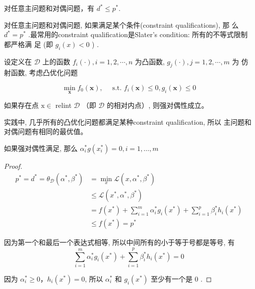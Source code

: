 \begin{theorem}[弱对偶性]
    对任意主问题和对偶问题，有 $ d^{*} \leqslant p^{*} $.
\end{theorem}

\begin{theorem}[强对偶性]
    对任意主问题和对偶问题, 如果满足某个条件(constraint qualifications), 那 么 $ d^{*}=p^{*} $ .最常用的constraint qualification是Slater's condition: 所有的不等式限制都严格满 足 (即 $ g_{i}(x)<0 $ ) .
\end{theorem}

\begin{theorem}[Slater 条件]
    设定义在 $ \mathcal{D} $ 上的函数 $ f_{i}(\cdot), i=1,2, \cdots, n $ 为凸函数, $ g_{j}(\cdot), j=1,2, \cdots, m $ 为 仿射函数, 考虑凸优化问题

    $$
    \min _{\mathbf{x}} f_{0}(\mathbf{x}), \quad \text { s.t. } f_{i}(\mathbf{x}) \leq 0, g_{i}(\mathbf{x}) \leq 0
    $$

    如果存在点 $ \mathrm{x} \in $ relint $ \mathcal{D} $ （即 $ \mathcal{D} $ 的相对内点）, 则强对偶性成立。
\end{theorem}

实践中, 几乎所有的凸优化问题都满足某种constraint qualification, 所以 主问题和对偶问题有相同的最优值。

\begin{theorem}
    如果强对偶性满足, 那么 $ \alpha_{i}^{*} g\left(x_{i}^{*}\right)=0, i=1, \ldots, m $
    
\end{theorem}

\begin{proof}
    $$
    \begin{aligned}
    p^{*}=d^{*}=\theta_{\mathcal{D}}\left(\alpha^{*}, \beta^{*}\right) &=\min _{x} \mathcal{L}\left(x, \alpha^{*}, \beta^{*}\right) \\
    & \leqslant \mathcal{L}\left(x^{*}, \alpha^{*}, \beta^{*}\right) \\
    &=f\left(x^{*}\right)+\sum_{i=1}^{m} \alpha_{i}^{*} g_{i}\left(x^{*}\right)+\sum_{i=1}^{p} \beta_{i}^{*} h_{i}\left(x^{*}\right) \\
    & \leqslant f\left(x^{*}\right)=p^{*}
    \end{aligned}
    $$

    因为第一个和最后一个表达式相等, 所以中间所有的小于等于号都是等号, 有 $$ \sum_{i=1}^{m} \alpha_{i}^{*} g_{i}\left(x^{*}\right)+\sum_{i=1}^{p} \beta_{i}^{*} h_{i}\left(x^{*}\right)=0 $$

    因为 $ \alpha_{i}^{*} \geqslant 0 ， h_{i}\left(x^{*}\right)=0 $, 所以 $ \alpha_{i}^{*} $ 和 $ g_{i}\left(x^{*}\right) $ 至少有一个是 0 .
\end{proof}

